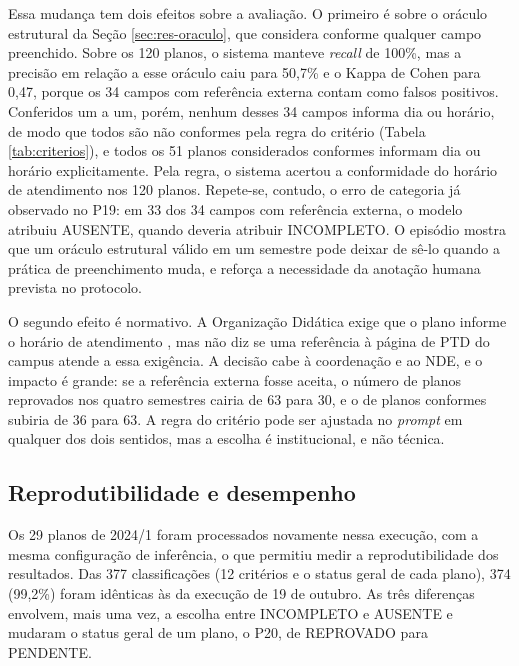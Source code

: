 Essa mudança tem dois efeitos sobre a avaliação. O primeiro é sobre o oráculo estrutural da Seção \ref{sec:res-oraculo}, que considera conforme qualquer campo preenchido. Sobre os 120 planos, o sistema manteve \textit{recall} de 100\%, mas a precisão em relação a esse oráculo caiu para 50,7\% e o Kappa de Cohen para 0,47, porque os 34 campos com referência externa contam como falsos positivos. Conferidos um a um, porém, nenhum desses 34 campos informa dia ou horário, de modo que todos são não conformes pela regra do critério (Tabela \ref{tab:criterios}), e todos os 51 planos considerados conformes informam dia ou horário explicitamente. Pela regra, o sistema acertou a conformidade do horário de atendimento nos 120 planos. Repete-se, contudo, o erro de categoria já observado no P19: em 33 dos 34 campos com referência externa, o modelo atribuiu AUSENTE, quando deveria atribuir INCOMPLETO. O episódio mostra que um oráculo estrutural válido em um semestre pode deixar de sê-lo quando a prática de preenchimento muda, e reforça a necessidade da anotação humana prevista no protocolo.

O segundo efeito é normativo. A Organização Didática exige que o plano informe o horário de atendimento \cite{ifc2022}, mas não diz se uma referência à página de PTD do campus atende a essa exigência. A decisão cabe à coordenação e ao NDE, e o impacto é grande: se a referência externa fosse aceita, o número de planos reprovados nos quatro semestres cairia de 63 para 30, e o de planos conformes subiria de 36 para 63. A regra do critério pode ser ajustada no \textit{prompt} em qualquer dos dois sentidos, mas a escolha é institucional, e não técnica.

\subsection{Reprodutibilidade e desempenho}

Os 29 planos de 2024/1 foram processados novamente nessa execução, com a mesma configuração de inferência, o que permitiu medir a reprodutibilidade dos resultados. Das 377 classificações (12 critérios e o status geral de cada plano), 374 (99,2\%) foram idênticas às da execução de 19 de outubro. As três diferenças envolvem, mais uma vez, a escolha entre INCOMPLETO e AUSENTE e mudaram o status geral de um plano, o P20, de REPROVADO para PENDENTE.

